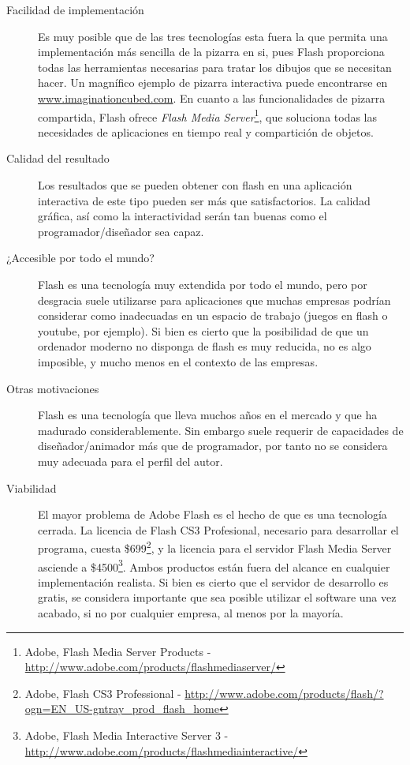 \begin{description}
	\item[Facilidad de implementación] Es muy posible que de las tres tecnologías esta fuera la que permita una implementación más sencilla de la pizarra en si, pues Flash proporciona todas las herramientas necesarias para tratar los dibujos que se necesitan hacer. Un magnífico ejemplo de pizarra interactiva puede encontrarse en \url{www.imaginationcubed.com}. En cuanto a las funcionalidades de pizarra compartida, Flash ofrece \emph{Flash Media Server}\footnote{Adobe, Flash Media Server Products - \url{http://www.adobe.com/products/flashmediaserver/}}, que soluciona todas las necesidades de aplicaciones en tiempo real y compartición de objetos.
	\item[Calidad del resultado] Los resultados que se pueden obtener con flash en una aplicación interactiva de este tipo pueden ser más que satisfactorios. La calidad gráfica, así como la interactividad serán tan buenas como el programador/diseñador sea capaz.
	\item[¿Accesible por todo el mundo?] Flash es una tecnología muy extendida por todo el mundo, pero por desgracia suele utilizarse para aplicaciones que muchas empresas podrían considerar como inadecuadas en un espacio de trabajo (juegos en flash o youtube, por ejemplo). Si bien es cierto que la posibilidad de que un ordenador moderno no disponga de flash es muy reducida, no es algo imposible, y mucho menos en el contexto de las empresas.
	\item[Otras motivaciones] Flash es una tecnología que lleva muchos años en el mercado y que ha madurado considerablemente. Sin embargo suele requerir de capacidades de diseñador/animador más que de programador, por tanto no se considera muy adecuada para el perfil del autor.
	\item[Viabilidad] El mayor problema de Adobe Flash es el hecho de que es una tecnología cerrada. La licencia de Flash CS3 Profesional, necesario para desarrollar el programa, cuesta \$699\footnote{Adobe, Flash CS3 Professional - \url{http://www.adobe.com/products/flash/?ogn=EN_US-gntray_prod_flash_home}}, y la licencia para el servidor Flash Media Server asciende a \$4500\footnote{Adobe, Flash Media Interactive Server 3 - \url{http://www.adobe.com/products/flashmediainteractive/}}. Ambos productos están fuera del alcance en cualquier implementación realista. Si bien es cierto que el servidor de desarrollo es gratis, se considera importante que sea posible utilizar el software una vez acabado, si no por cualquier empresa, al menos por la mayoría.
\end{description}

